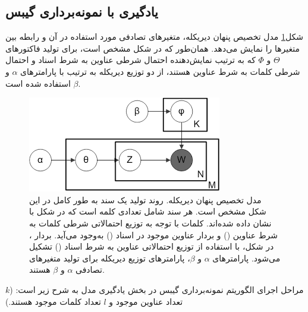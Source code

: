 \documentclass[11.5pt,a4paper]{article}
\begin{document}
\subsection{یادگیری با نمونه‌برداری گیبس}
شکل\ref{eq:lda}
مدل تخصیص پنهان دیریکله، متغیرهای تصادفی مورد استفاده در آن و رابطه بین متغیرها را نمایش می‌دهد. همان‌طور که در شکل مشخص است، برای تولید فاکتورهای $\Theta$ و $\Phi$ که به ترتیب نمایش‌دهنده احتمال شرطی عناوین به شرط اسناد و احتمال شرطی کلمات به شرط عناوین هستند، از دو توزیع دیریکله به ترتیب با پارامترهای $\alpha$ و $\beta$ استفاده شده است.


\begin{figure}[h]
\centering
\includegraphics[scale=0.6]{Imgs/LDA.png}
\caption{مدل تخصیص پنهان دیریکله. روند تولید یک سند به طور کامل در این شکل مشخص است. هر سند شامل تعدادی کلمه است که در شکل با  نشان داده‌ شده‌اند. کلمات با توجه به توزیع احتمالاتی شرطی کلمات به شرط عناوین (\lr{$\Theta$}) و بردار عناوین موجود در اسناد () به‌وجود می‌آید. بردار ، در شکل، با استفاده از توزیع احتمالاتی عناوین به شرط اسناد (\lr{$\Phi$}) تشکیل می‌شود. پارامترهای $\alpha$ و $\beta$، پارامترهای توزیع دیریکله برای تولید متغیرهای تصادفی $\alpha$ و $\beta$ هستند.}
\label{eq:lda}
\end{figure}

مراحل اجرای الگوریتم نمونه‌برداری گیبس در بخش یادگیری مدل به شرح زیر است:
($k$ تعداد عناوین موجود و $l$ تعداد کلمات موجود هستند.)
\end{document}
